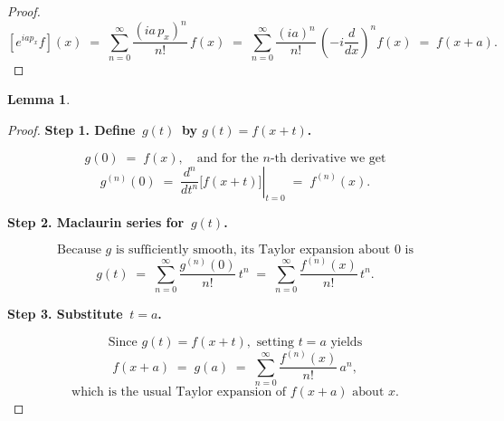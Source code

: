 \documentclass[12pt]{article}
\theoremstyle{theorem}
\newtheorem{lemma}[theorem]{Lemma}
\theoremstyle{definition}
\theoremstyle{remark}
\theoremstyle{gremark}
\theoremstyle{discussion}
\theoremstyle{notation}
\begin{document}
	\begin{proof}
		\[
		\left[e^{ia p_x} f\right](x)
		\;=\; \sum_{n=0}^\infty \frac{(ia\,p_x)^n}{n!}\,f(x)
		\;=\; \sum_{n=0}^\infty \frac{(ia)^n}{n!}\,\left(-i\frac{d}{dx}\right)^n f(x)
		\;=\; f(x+a).
		\]
	\end{proof}
	
	
	\begin{lemma}
		
	\end{lemma}

	\begin{proof}
		\noindent
		\textbf{Step 1. Define \(\,g(t)\,\) by \(g(t) = f(x + t)\).}
		
		\[
		g(0) \;=\; f(x), 
		\quad\text{and for the \(n\)-th derivative we get}
		\]
		\[
		g^{(n)}(0) 
		\;=\; \left.\frac{d^n}{dt^n} \bigl[f(x + t)\bigr]\right|_{t=0}
		\;=\; f^{(n)}(x).
		\]
		
		\noindent
		\textbf{Step 2. Maclaurin series for \(\,g(t)\).}
		
		\[
		\text{Because \(g\) is sufficiently smooth, its Taylor expansion about 0 is}
		\]
		\[
		g(t)
		\;=\; \sum_{n=0}^{\infty} \frac{g^{(n)}(0)}{n!} \, t^n
		\;=\; \sum_{n=0}^{\infty} \frac{f^{(n)}(x)}{n!} \, t^n.
		\]
		
		\noindent
		\textbf{Step 3. Substitute \(\,t = a\).}
		
		\[
		\text{Since } g(t) = f(x + t), \text{ setting } t = a \text{ yields}
		\]
		\[
		f(x + a) 
		\;=\; g(a) 
		\;=\; \sum_{n=0}^{\infty} \frac{f^{(n)}(x)}{n!} \, a^n,
		\]
		\[
		\text{which is the usual Taylor expansion of } f(x+a) \text{ about } x.
		\]
	\end{proof}
	
	
	
	
	
\end{document}
